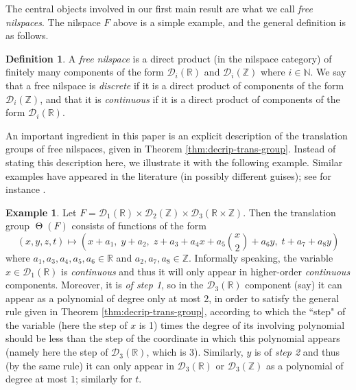 \documentclass[a4paper,12pt,reqno]{amsart}
\theoremstyle{definition}
\newtheorem{defn}[theorem]{Definition}
\newtheorem{example}[theorem]{Example}
\newcommand{\mc}{\mathcal}
\newcommand{\mb}{\mathbb}
\DeclareMathOperator{\tran}{\Theta}
\begin{document}
\noindent The central objects involved in our first main result  are what we call \emph{free nilspaces}. The nilspace $F$ above is a simple example, and the general definition is as follows.
\begin{defn}\label{def:free-nil-intro}
A \emph{free nilspace} is a direct product (in the nilspace category) of finitely many components of the form $\mc{D}_i(\mb{R})$ and $\mc{D}_i(\mb{Z})$ where $i\in \mb{N}$. We say that a free nilspace is \emph{discrete} if it is a direct product of components of the form $\mathcal{D}_i(\mathbb{Z})$, and that it is \emph{continuous} if it is a direct product of components of the form $\mc{D}_i(\mb{R})$.
\end{defn}

\noindent An important ingredient in this paper is an explicit description of the translation groups of free nilspaces, given in Theorem \ref{thm:decrip-trans-group}. Instead of stating this description here, we illustrate it with the following example. Similar examples have appeared in the literature (in possibly different guises); see for instance \cite[Definition 1.9]{J&T}.
\begin{example}
Let $F=\mc{D}_1(\mb{R})\times \mc{D}_2(\mb{Z})\times \mc{D}_3(\mb{R}\times \mb{Z})$. Then the translation group $\tran(F)$ consists of functions of the form
\[
(x,y,z,t)\mapsto \left(x+a_1,\; y+a_2,\; z+a_3+a_4x+a_5\binom{x}{2}+a_6y,\;  t+a_7+a_8y\right)
\]
where $a_1,a_3,a_4,a_5,a_6\in \mb{R}$ and $a_2,a_7,a_8\in \mb{Z}$. Informally speaking, the variable $x\in \mc{D}_1(\mb{R})$ is \emph{continuous} and thus it will only appear in higher-order \emph{continuous} components. Moreover, it is \emph{of step 1}, so in the $\mc{D}_3(\mb{R})$ component (say) it can appear as a polynomial of degree only at most 2, in order to satisfy the general rule given in Theorem \ref{thm:decrip-trans-group}, according to which the ``step" of the variable (here the step of $x$ is 1) times the degree of its involving polynomial should be less than the step of the coordinate in which this polynomial appears (namely here the step of $\mc{D}_3(\mb{R})$, which is 3). Similarly, $y$ is of \emph{step 2} and thus (by the same rule) it can only appear in $\mc{D}_3(\mb{R})$ or $\mc{D}_3(\mb{Z})$ as a polynomial of degree at most $1$; similarly for $t$.
\end{example}
\end{document}
